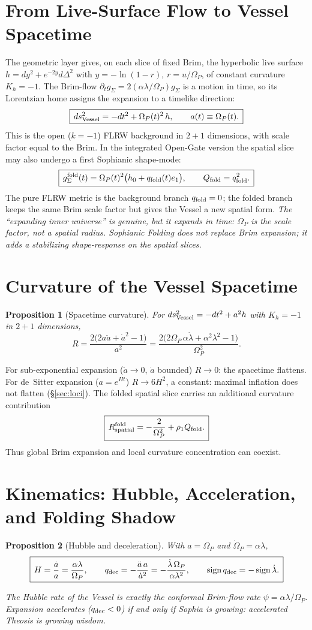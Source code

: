 \documentclass[11pt,a4paper]{article}
\newcommand{\Op}{\Omega_P}
\newcommand{\qdec}{q_{\rm dec}}
\newcommand{\qfold}{q_{\rm fold}}
\newcommand{\Qfold}{Q_{\rm fold}}
\newcommand{\note}[1]{\textcolor{black!65}{\emph{#1}}}
\theoremstyle{plain}
\newtheorem{proposition}{Proposition}
\theoremstyle{remark}
\theoremstyle{definition}
\begin{document}
\section{From Live-Surface Flow to Vessel Spacetime}
The geometric layer gives, on each slice of fixed Brim, the hyperbolic live surface
$h=dy^2+e^{-2y}d\Delta^2$ with $y=-\ln(1-r)$, $r=u/\Op$, of constant curvature $K_h=-1$. The
Brim-flow $\partial_t g_\Sigma=2(\alpha\lambda/\Op)g_\Sigma$ is a motion in time, so its Lorentzian
home assigns the expansion to a timelike direction:
\[
\boxed{\,ds^2_{\rm Vessel}=-dt^2+\Op(t)^2\,h,\qquad a(t)\equiv\Op(t).\,}
\]
This is the open ($k=-1$) FLRW background in $2{+}1$ dimensions, with scale factor equal to the Brim.
In the integrated Open-Gate version the spatial slice may also undergo a first Sophianic shape-mode:
\[
\boxed{\,g_\Sigma^{\rm fold}(t)=\Op(t)^2\bigl(h_0+\qfold(t)e_1\bigr),\qquad \Qfold=\qfold^2.\,}
\]
The pure FLRW metric is the background branch $\qfold=0$; the folded branch keeps the same Brim scale
factor but gives the Vessel a new spatial form.
\note{The ``expanding inner universe'' is genuine, but it expands in time: $\Op$ is the scale factor,
not a spatial radius. Sophianic Folding does not replace Brim expansion; it adds a stabilizing
shape-response on the spatial slices.}

\section{Curvature of the Vessel Spacetime}
\begin{proposition}[Spacetime curvature]\label{prop:R}
For $ds^2_{\rm Vessel}=-dt^2+a^2h$ with $K_h=-1$ in $2{+}1$ dimensions,
\[
\boxed{\,R=\frac{2\bigl(2a\ddot a+\dot a^2-1\bigr)}{a^2}
=\frac{2\bigl(2\Op\,\alpha\dot\lambda+\alpha^2\lambda^2-1\bigr)}{\Op^2}.\,}
\]
\end{proposition}
\noindent For sub-exponential expansion ($\ddot a\to0$, $\dot a$ bounded) $R\to0$: the spacetime
flattens. For de~Sitter expansion ($a=e^{Ht}$) $R\to 6H^2$, a constant: maximal inflation does not
flatten (\S\ref{sec:loci}). The folded spatial slice carries an additional curvature contribution
\[
\boxed{\,R_{\rm spatial}^{\rm fold}=-\frac{2}{\Op^2}+\rho_1\Qfold.\,}
\]
Thus global Brim expansion and local curvature concentration can coexist.

\section{Kinematics: Hubble, Acceleration, and Folding Shadow}
\begin{proposition}[Hubble and deceleration]\label{prop:kin}
With $a=\Op$ and $\dot\Op=\alpha\lambda$,
\[
\boxed{\,H=\frac{\dot a}{a}=\frac{\alpha\lambda}{\Op},\qquad
\qdec=-\frac{\ddot a\,a}{\dot a^2}=-\frac{\dot\lambda\,\Op}{\alpha\lambda^2},\qquad
\operatorname{sign}\qdec=-\operatorname{sign}\dot\lambda.\,}
\]
\end{proposition}
\note{The Hubble rate of the Vessel is exactly the conformal Brim-flow rate $\psi=\alpha\lambda/\Op$.
Expansion accelerates ($\qdec<0$) if and only if Sophia is growing: accelerated Theosis is growing wisdom.}
\end{document}
